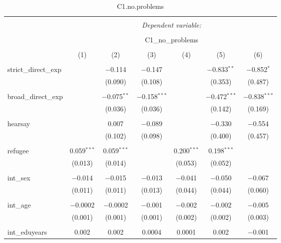 
\begin{table}[H] \centering 
  \caption{C1.no.problems} 
  \label{} 
\tiny 
\begin{tabular}{@{\extracolsep{4pt}}lcccccc} 
\\[-1.8ex]\hline 
\hline \\[-1.8ex] 
 & \multicolumn{6}{c}{\textit{Dependent variable:}} \\ 
\cline{2-7} 
\\[-1.8ex] & \multicolumn{6}{c}{C1\_no\_problems} \\ 
\\[-1.8ex] & (1) & (2) & (3) & (4) & (5) & (6)\\ 
\hline \\[-1.8ex] 
 strict\_direct\_exp &  & $-$0.114 & $-$0.147 &  & $-$0.833$^{**}$ & $-$0.852$^{*}$ \\ 
  &  & (0.090) & (0.108) &  & (0.353) & (0.487) \\ 
  & & & & & & \\ 
 broad\_direct\_exp &  & $-$0.075$^{**}$ & $-$0.158$^{***}$ &  & $-$0.472$^{***}$ & $-$0.838$^{***}$ \\ 
  &  & (0.036) & (0.036) &  & (0.142) & (0.169) \\ 
  & & & & & & \\ 
 hearsay &  & 0.007 & $-$0.089 &  & $-$0.330 & $-$0.554 \\ 
  &  & (0.102) & (0.098) &  & (0.400) & (0.457) \\ 
  & & & & & & \\ 
 refugee & 0.059$^{***}$ & 0.059$^{***}$ &  & 0.200$^{***}$ & 0.198$^{***}$ &  \\ 
  & (0.013) & (0.014) &  & (0.053) & (0.052) &  \\ 
  & & & & & & \\ 
 int\_sex & $-$0.014 & $-$0.015 & $-$0.013 & $-$0.041 & $-$0.050 & $-$0.067 \\ 
  & (0.011) & (0.011) & (0.013) & (0.044) & (0.044) & (0.060) \\ 
  & & & & & & \\ 
 int\_age & $-$0.0002 & $-$0.0002 & $-$0.001 & $-$0.002 & $-$0.002 & $-$0.005 \\ 
  & (0.001) & (0.001) & (0.001) & (0.002) & (0.002) & (0.003) \\ 
  & & & & & & \\ 
 int\_eduyears & 0.002 & 0.002 & 0.0004 & 0.0001 & 0.002 & $-$0.001 \\ 

\end{tabular}
\end{table}
